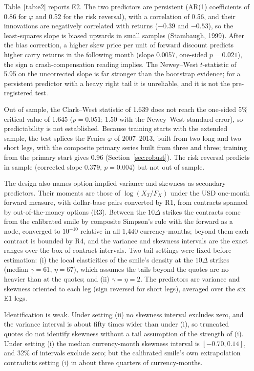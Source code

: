 \documentclass[11pt]{article}
\theoremstyle{result}
\newcommand{\D}{\Delta}
\begin{document}
Table~\ref{tab:e2} reports E2. The two predictors are persistent (AR(1) coefficients of 0.86 for $\varphi$ and 0.52 for the risk reversal), with a correlation of 0.56, and their innovations are negatively correlated with returns ($-0.39$ and $-0.53$), so the least-squares slope is biased upwards in small samples (Stambaugh, 1999). After the bias correction, a higher skew price per unit of forward discount predicts higher carry returns in the following month (slope 0.0057, one-sided $p=0.021$), the sign a crash-compensation reading implies. The Newey--West $t$-statistic of 5.95 on the uncorrected slope is far stronger than the bootstrap evidence; for a persistent predictor with a heavy right tail it is unreliable, and it is not the pre-registered test.

Out of sample, the Clark--West statistic of 1.639 does not reach the one-sided 5\% critical value of 1.645 ($p=0.051$; 1.50 with the Newey--West standard error), so predictability is not established. Because training starts with the extended sample, the test splices the Fenics $\varphi$ of 2007--2013, built from two long and two short legs, with the composite primary series built from three and three; training from the primary start gives 0.96 (Section~\ref{sec:robust}). The risk reversal predicts in sample (corrected slope 0.379, $p=0.004$) but not out of sample.

The design also names option-implied variance and skewness as secondary predictors. Their moments are those of $\log(X_T/F_X)$ under the USD one-month forward measure, with dollar-base pairs converted by R1, from contracts spanned by out-of-the-money options (R3). Between the $10\D$ strikes the contracts come from the calibrated smile by composite Simpson's rule with the forward as a node, converged to $10^{-10}$ relative in all 1,440 currency-months; beyond them each contract is bounded by R4, and the variance and skewness intervals are the exact ranges over the box of contract intervals. Two tail settings were fixed before estimation: (i) the local elasticities of the smile's density at the $10\D$ strikes (median $\gamma=61$, $\eta=67$), which assumes the tails beyond the quotes are no heavier than at the quotes; and (ii) $\gamma=\eta=2$. The predictors are variance and skewness oriented to each leg (sign reversed for short legs), averaged over the six E1 legs.

Identification is weak. Under setting (ii) no skewness interval excludes zero, and the variance interval is about fifty times wider than under (i), so truncated quotes do not identify skewness without a tail assumption of the strength of (i). Under setting (i) the median currency-month skewness interval is $[-0.70,0.14]$, and 32\% of intervals exclude zero; but the calibrated smile's own extrapolation contradicts setting (i) in about three quarters of currency-months.
\end{document}
